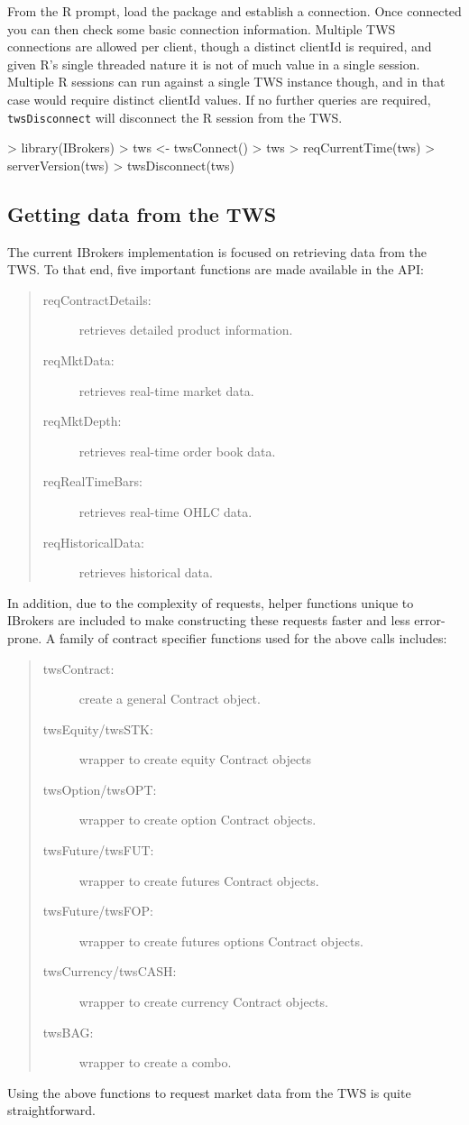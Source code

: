 \documentclass{article}
\begin{document}
From the R prompt, load the package and establish a
connection. Once connected you can then check some basic connection information.
Multiple TWS connections are allowed per client, though a distinct
clientId is required, and given R's single threaded nature it is not
of much value in a single session.  Multiple R sessions can run
against a single TWS instance though, and in that case would require
distinct clientId values.
If no further queries are required, {\tt twsDisconnect} will disconnect
the R session from the TWS.
\begin{Schunk}
\begin{Sinput}
> library(IBrokers)
> tws <- twsConnect()
> tws
> reqCurrentTime(tws)
> serverVersion(tws)
> twsDisconnect(tws)
\end{Sinput}
\end{Schunk}

\subsection{Getting data from the TWS}
The current IBrokers implementation is focused on
retrieving data from the TWS. To that end, five important
functions are made available in the API:
\begin{quote}
\begin{description}
\item[reqContractDetails:] retrieves detailed product information.
\item[reqMktData:] retrieves real-time market data.
\item[reqMktDepth:] retrieves real-time order book data.
\item[reqRealTimeBars:] retrieves real-time OHLC data.
\item[reqHistoricalData:] retrieves historical data.
\end{description}
\end{quote}
In addition, due to the complexity of requests,
helper functions unique to IBrokers
are included to make constructing these requests faster
and less error-prone. A family of contract
specifier functions used for the above calls
includes:
\begin{quote}
\begin{description}
\item[twsContract:] create a general Contract object.
\item[twsEquity/twsSTK:] wrapper to create equity Contract objects
\item[twsOption/twsOPT:] wrapper to create option Contract objects.
\item[twsFuture/twsFUT:] wrapper to create futures Contract objects.
\item[twsFuture/twsFOP:] wrapper to create futures options Contract objects.
\item[twsCurrency/twsCASH:] wrapper to create currency Contract objects.
\item[twsBAG:] wrapper to create a combo.
\end{description}
\end{quote}
Using the above functions to request market data from the TWS
is quite straightforward.
\end{document}
